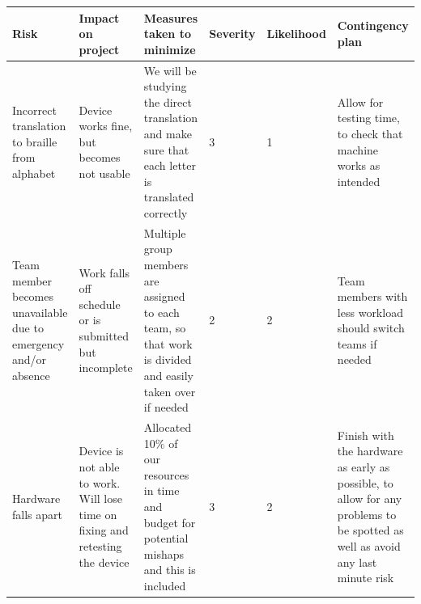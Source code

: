 \documentclass{article}
\begin{document}
\begin{table}[h]
\begin{center}
\begin{small}
\begin{tabular}{|p{3cm}|p{3cm}|p{3cm}|p{1cm}|p{1.2cm}|p{3cm}|}
\hline
\rowcolor[HTML]{C0C0C0} 
Risk                                                                                              & Impact on project                                                                                               & Measures taken to minimize                                                                                                                                                                                & Severity & Likelihood & Contingency plan                                                                                                                                  \\ \hline
Incorrect translation to braille from alphabet                                                    & Device works fine, but becomes not usable                                                                       & We will be studying the direct translation and make sure that each letter is translated correctly                                                                                                       & 3        & 1          & Allow for testing time, to check that machine works as intended                                                                                   \\ \hline
Team member becomes unavailable due to emergency and/or absence                                   & Work falls off schedule or is submitted but incomplete                                                          & Multiple group members are assigned to each team, so that work is divided and easily taken over if needed                                                                                                 & 2        & 2          & Team members with less workload should switch teams if needed                                                                                     \\ \hline
Hardware falls apart                                                                              & Device is not able to work. Will lose time on fixing and retesting the device                                   & Allocated 10\% of our resources in time and budget for potential mishaps and this is included                                                                                                             & 3        & 2          & Finish with the hardware as early as possible, to allow for any problems to be spotted as well as avoid any last minute risk              \\ \hline

\end{tabular}
\end{small}
\end{center}
\end{table}
\end{document}

